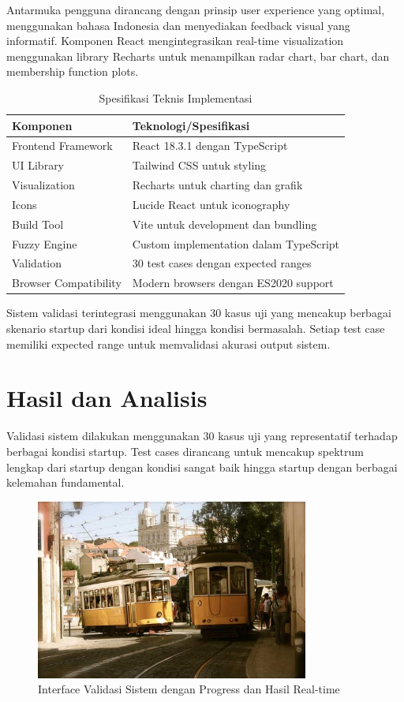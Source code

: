 \documentclass[12pt,a4paper]{article}
\begin{document}
Antarmuka pengguna dirancang dengan prinsip user experience yang optimal, menggunakan bahasa Indonesia dan menyediakan feedback visual yang informatif. Komponen React mengintegrasikan real-time visualization menggunakan library Recharts untuk menampilkan radar chart, bar chart, dan membership function plots.

\begin{table}[H]
\centering
\caption{Spesifikasi Teknis Implementasi}
\label{tab:tech-specs}
\begin{tabular}{@{}ll@{}}
\toprule
\textbf{Komponen} & \textbf{Teknologi/Spesifikasi} \\
\midrule
Frontend Framework & React 18.3.1 dengan TypeScript \\
UI Library & Tailwind CSS untuk styling \\
Visualization & Recharts untuk charting dan grafik \\
Icons & Lucide React untuk iconography \\
Build Tool & Vite untuk development dan bundling \\
Fuzzy Engine & Custom implementation dalam TypeScript \\
Validation & 30 test cases dengan expected ranges \\
Browser Compatibility & Modern browsers dengan ES2020 support \\
\bottomrule
\end{tabular}
\end{table}

Sistem validasi terintegrasi menggunakan 30 kasus uji yang mencakup berbagai skenario startup dari kondisi ideal hingga kondisi bermasalah. Setiap test case memiliki expected range untuk memvalidasi akurasi output sistem.

\section{Hasil dan Analisis}

Validasi sistem dilakukan menggunakan 30 kasus uji yang representatif terhadap berbagai kondisi startup. Test cases dirancang untuk mencakup spektrum lengkap dari startup dengan kondisi sangat baik hingga startup dengan berbagai kelemahan fundamental.

\begin{figure}[H]
    \centering
    \includegraphics[width=0.8\textwidth]{assets/image.png}
    \caption{Interface Validasi Sistem dengan Progress dan Hasil Real-time}
    \label{fig:validation-ui}
\end{figure}
\end{document}
